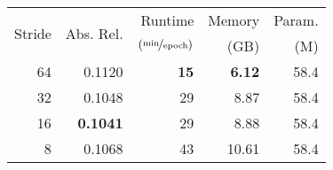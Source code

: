 \begin{tabular}{rrrrr}
\toprule
\multirow{2}{*}{Stride} &  \multirow{2}{*}{Abs. Rel.} & Runtime  & Memory & Param.  \\
 & & {$\left(\nicefrac{\text{min}}{\text{epoch}}\right)$} & (GB) & (M) \\
\midrule
64 &    0.1120 & \textbf{15}  &     \textbf{6.12} &  58.4 \\
32 &    0.1048 &  29  &     8.87 &  58.4 \\
16 &    \textbf{0.1041} &  29  &     8.88 &  58.4 \\
8 &     0.1068 &  43  &    10.61 &  58.4 \\
\bottomrule
\end{tabular}
